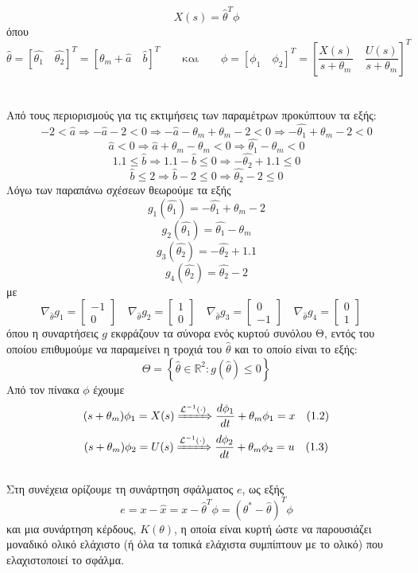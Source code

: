 \documentclass[12pt]{article}
\newcommand{\Lagr}{\mathcal{L}}
\begin{document}
\[X(s)=\hat{\theta}^{T}\phi \]
όπου
\[
\hat{\theta}=\left[ \hat{\theta_{1}} \quad \hat{\theta_{2}} \right]^{T}=[\theta_m+\hat{a} \quad \hat{b}]^{T} \qquad \text{και} \qquad \phi=\left[ \phi_{1} \quad \phi_{2} \right]^{T}=\left[\frac{ X(s)}{s+\theta_m} \quad \frac{ U(s)}{s+\theta_m}\right]^{T} \]
\\ \\
Από τους περιορισμούς για τις εκτιμήσεις των παραμέτρων προκύπτουν τα εξής: 
\[ -2<\hat{a} \Rightarrow -\hat{a}-2<0 \Rightarrow -\hat{a}-\theta_m+\theta_m-2<0 \Rightarrow -\hat{\theta_1}+\theta_m-2<0 \]
\[ \hat{a}<0 \Rightarrow \hat{a}+\theta_m-\theta_m <0 \Rightarrow \hat{\theta_1}-\theta_m<0 \]
\[ 1.1 \leq \hat{b} \Rightarrow 1.1-\hat{b} \leq 0 \Rightarrow -\hat{\theta_2}+1.1 \leq 0 \]
\[ \hat{b} \leq 2 \Rightarrow \hat{b}-2 \leq 0 \Rightarrow \hat{\theta_2}-2 \leq 0 \]
Λόγω των παραπάνω σχέσεων θεωρούμε τα εξής
\[ g_1(\hat{\theta_1})=-\hat{\theta_1}+\theta_m-2\]
\[ g_2(\hat{\theta_1})=\hat{\theta_1}-\theta_m\]
\[ g_3(\hat{\theta_2})=-\hat{\theta_2}+1.1\]
\[ g_4(\hat{\theta_2})=\hat{\theta_2}-2\]
 με \[ \nabla_{\hat{\theta}} g_1 = 
 \begin{bmatrix}
-1  \\ 
 0
\end{bmatrix}
\quad 
\nabla_{\hat{\theta}} g_2 = 
 \begin{bmatrix}
1 \\ 
0
\end{bmatrix}
\quad
\nabla_{\hat{\theta}} g_3 = 
 \begin{bmatrix}
0  \\ 
-1
\end{bmatrix}
\quad 
\nabla_{\hat{\theta}} g_4 = 
 \begin{bmatrix}
0 \\ 
1
\end{bmatrix}
\quad
\]
όπου η συναρτήσεις $g$ εκφράζουν τα σύνορα ενός κυρτού συνόλου Θ, εντός του οποίου επιθυμούμε να παραμείνει η τροχιά του $\hat{\theta}$ και το οποίο είναι το εξής:
\[ \Theta= \left \{ \hat{\theta} \in \mathbb{R}^2 : g(\hat{\theta}) \leq 0 \right \} \] 
Από τον πίνακα $\phi$ έχουμε
\[ (s+\theta_m)\phi_1=X(s) \xRightarrow{\Lagr^{-1}(\cdot)} \frac{d\phi_{1}}{dt}+\theta_m\phi_{1}=x \quad (1.2)\]
\[ (s+\theta_m)\phi_2=U(s) \xRightarrow{\Lagr^{-1}(\cdot)} \frac{d\phi_{2}}{dt}+\theta_m\phi_{2}=u \quad (1.3)\]
\\
Στη συνέχεια ορίζουμε τη συνάρτηση σφάλματος $e$, ως εξής
\[ e=x-\hat{x}=x-\hat{\theta}^{T}\phi = (\theta^{*}-\hat{\theta})^{T} \phi \]
και μια συνάρτηση κέρδους, $K(\theta)$, η οποία είναι κυρτή ώστε να παρουσιάζει μοναδικό ολικό ελάχιστο (ή όλα τα τοπικά ελάχιστα συμπίπτουν με το ολικό) που ελαχιστοποιεί το σφάλμα.
\end{document}
